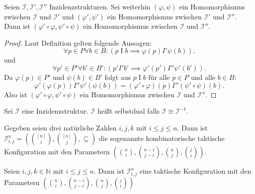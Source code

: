 \documentclass{article}
\begin{document}
\begin{theorem}
  Seien $\mathcal{I}, \mathcal{I}', \mathcal{I}''$ Inzidenzstrukturen.
  Sei weiterhin $(\varphi, \psi)$ ein Homomorphismus zwischen $\mathcal{I}$ und $\mathcal{I}'$
  und $(\varphi', \psi')$ ein Homomorphismus zwischen $\mathcal{I}'$ und $\mathcal{I}''$.
  Dann ist $(\varphi' \circ \varphi, \psi' \circ \psi)$ ein Homomorphismus
  zwischen $\mathcal{I}$ und $\mathcal{I}''$.
\end{theorem}
\begin{proof}
  Laut Definition gelten folgende Aussagen:
  \begin{equation*}
    \forall p \in P \forall b \in B \colon (p \mathrel{I} b \implies \varphi(p) \mathrel{I'} \psi(b)).
  \end{equation*}
  und
  \begin{equation*}
    \forall p' \in P' \forall b' \in B' \colon (p' \mathrel{I'} b' \implies \varphi'(p') \mathrel{I''} \psi'(b')).
  \end{equation*}
  Da $\varphi(p) \in P'$ und $\psi(b) \in B'$ folgt aus $p \mathrel{I} b$ für alle $p \in P$ und alle $b \in B$:
  \begin{equation*}
    \varphi'(\varphi(p)) \mathrel{I''} \psi'(\psi(b)) = (\varphi' \circ \varphi)(p) \mathrel{I''} (\psi' \circ \psi)(b).
  \end{equation*}
  Also ist $(\varphi' \circ \varphi, \psi' \circ \psi)$ ein Homomorphismus
  zwischen $\mathcal{I}$ und $\mathcal{I}''$.
\end{proof}

\begin{definition}
  Sei $\mathcal{I}$ eine Inzidenzstruktur.
  $\mathcal{I}$ heißt selbstdual falls $\mathcal{I} \cong \mathcal{I}^{-1}$.
\end{definition}

\begin{definition}
  Gegeben seien drei natürliche Zahlen $i, j, k$ mit $i \leq j \leq n$.
  Dann ist ${\mathcal{I}^n_{i, j} = (\binom{[n]}{i}, \binom{[n]}{j}, \subseteq)}$ die sogenannte kombinatorische taktische Konfiguration
  mit den Parametern $(\binom{n}{i}, \binom{n - i}{j - i}, \binom{n}{j}, \binom{j}{i})$.
\end{definition}

\begin{theorem}
  Seien $i, j, k \in \mathbb{N}$ mit $i \leq j \leq n$.
  Dann ist $\mathcal{I}^n_{i, j}$ eine taktische Konfiguration
  mit den Parametern $(\binom{n}{i}, \binom{n - i}{j - i}, \binom{n}{j}, \binom{j}{i})$
\end{theorem}
\end{document}
